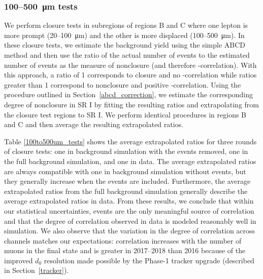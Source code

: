 \subsubsection{\num{100}--\SI{500}{\um} tests}
We perform closure tests in subregions of regions B and C where one lepton is more prompt (\num{20}--\SI{100}{\um}) and the other is more displaced (\num{100}--\SI{500}{\um}). In these closure tests, we estimate the background yield using the simple ABCD method and then use the ratio of the actual number of events to the estimated number of events as the measure of nonclosure (and therefore \ada-\adb correlation). With this approach, a ratio of 1 corresponds to closure and no \ada-\adb correlation while ratios greater than 1 correspond to nonclosure and positive \ada-\adb correlation. Using the procedure outlined in Section~\ref{abcd_correction}, we estimate the corresponding degree of nonclosure in SR I by fitting the resulting ratios and extrapolating from the closure test regions to SR I. We perform identical procedures in regions B and C and then average the resulting extrapolated ratios.

Table \ref{100to500um_tests} shows the average extrapolated ratios for three rounds of closure tests: one in background simulation with the \ztautaull events removed, one in the full background simulation, and one in data. The average extrapolated ratios are always compatible with one in background simulation without \ztautaull events, but they generally increase when the \ztautaull events are included. Furthermore, the average extrapolated ratios from the full background simulation generally describe the average extrapolated ratios in data. From these results, we conclude that within our statistical uncertainties, \ztautaull events are the only meaningful source of correlation and that the degree of correlation observed in data is modeled reasonably well in simulation. We also observe that the variation in the degree of correlation across channels matches our expectations: correlation increases with the number of muons in the final state and is greater in 2017--2018 than 2016 because of the improved $d_0$ resolution made possible by the Phase-1 tracker upgrade (described in Section~\ref{tracker}).



